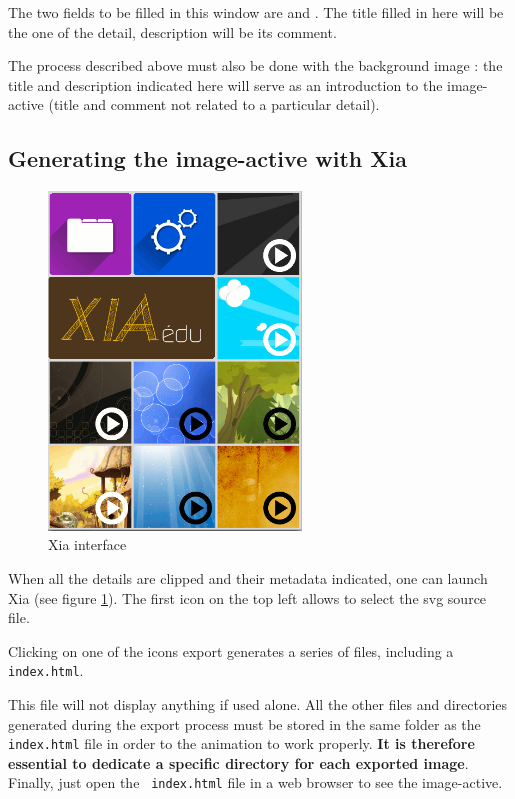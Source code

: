 The two fields to be filled in this window are  and 
.  The title filled in here will be the one of the detail, 
description will be its comment.

The process described above must also be done with the background image : 
the title and description indicated here will serve as an introduction to 
the image-active (title and comment not related to a particular detail).

\subsection{Generating the image-active with Xia}

\begin{figure}[htp]
 \centering
 \includegraphics[width=0.6\textwidth]{./images/xia_vue_generale}
 \caption{Xia interface}
 \label{xia_interface}
\end{figure}

When all the details are clipped and their metadata indicated, one can launch 
Xia (see figure  
\ref{xia_interface}). The first icon on the top left allows 
to select the svg source file.


Clicking on one of the icons export generates a series of files, including a 
\verb|index.html|. 

\begin{alerte}
This file will not display anything if used 
alone. All the other files and directories generated during the export process 
must be stored in  the same folder as the \verb|index.html| file in order to 
the animation to work properly. \textbf{It is therefore essential to 
dedicate a specific directory for each exported image}. Finally, just open 
the \verb| index.html| file in a web browser to see the image-active.
\end{alerte}

